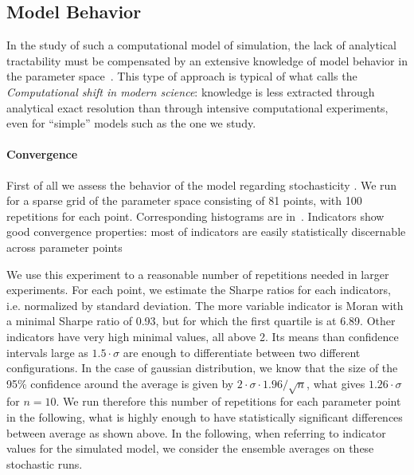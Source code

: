 \documentclass[10pt,letterpaper]{article}
\begin{document}
\subsection*{Model Behavior}


In the study of such a computational model of simulation, the lack of analytical tractability must be compensated by an extensive knowledge of model behavior in the parameter space~\cite{banos2013pour}. This type of approach is typical of what \cite{arthur2015complexity} calls the \emph{Computational shift in modern science}: knowledge is less extracted through analytical exact resolution than through intensive computational experiments, even for ``simple'' models such as the one we study.


\paragraph{Convergence}

First of all we  assess the behavior of the model regarding stochasticity . We run  for a sparse grid of the parameter space consisting of 81 points, with 100 repetitions for each point. Corresponding histograms are  in~. Indicators show good convergence properties: most of indicators are easily statistically discernable across parameter points


We use this experiment to  a reasonable number of repetitions needed in larger experiments. For each point, we estimate the Sharpe ratios for each indicators, i.e.  normalized by  standard deviation. The more variable indicator is Moran with a minimal Sharpe ratio of 0.93, but for which the first quartile is at 6.89. Other indicators have very high minimal values, all above 2. Its means than confidence intervals large as $1.5 \cdot \sigma$ are enough to differentiate between two different configurations. In the case of  gaussian distribution, we know that the size of the 95\% confidence around the average is given by $2\cdot \sigma \cdot 1.96 / \sqrt{n}$, what gives $1.26 \cdot \sigma$ for $n=10$. We run therefore this number of repetitions for each parameter point in the following, what is highly enough to have statistically significant differences between average as shown above. In the following, when referring to indicator values for the simulated model, we consider the ensemble averages on these stochastic runs.
\end{document}
